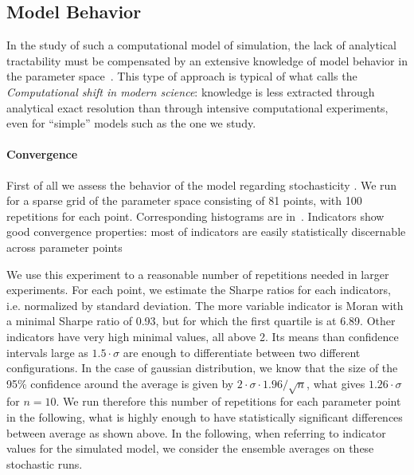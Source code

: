 \documentclass[10pt,letterpaper]{article}
\begin{document}
\subsection*{Model Behavior}


In the study of such a computational model of simulation, the lack of analytical tractability must be compensated by an extensive knowledge of model behavior in the parameter space~\cite{banos2013pour}. This type of approach is typical of what \cite{arthur2015complexity} calls the \emph{Computational shift in modern science}: knowledge is less extracted through analytical exact resolution than through intensive computational experiments, even for ``simple'' models such as the one we study.


\paragraph{Convergence}

First of all we  assess the behavior of the model regarding stochasticity . We run  for a sparse grid of the parameter space consisting of 81 points, with 100 repetitions for each point. Corresponding histograms are  in~. Indicators show good convergence properties: most of indicators are easily statistically discernable across parameter points


We use this experiment to  a reasonable number of repetitions needed in larger experiments. For each point, we estimate the Sharpe ratios for each indicators, i.e.  normalized by  standard deviation. The more variable indicator is Moran with a minimal Sharpe ratio of 0.93, but for which the first quartile is at 6.89. Other indicators have very high minimal values, all above 2. Its means than confidence intervals large as $1.5 \cdot \sigma$ are enough to differentiate between two different configurations. In the case of  gaussian distribution, we know that the size of the 95\% confidence around the average is given by $2\cdot \sigma \cdot 1.96 / \sqrt{n}$, what gives $1.26 \cdot \sigma$ for $n=10$. We run therefore this number of repetitions for each parameter point in the following, what is highly enough to have statistically significant differences between average as shown above. In the following, when referring to indicator values for the simulated model, we consider the ensemble averages on these stochastic runs.
\end{document}
